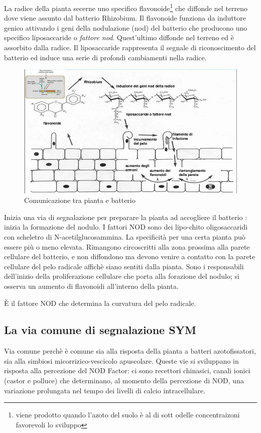 \documentclass[a4paper,12pt]{book}
\begin{document}
La radice della pianta secerne uno specifico flavonoide\footnote{viene prodotto quando l'azoto del suolo è al di sott odelle concentraizoni favorevoli lo sviluppo} che diffonde nel terreno dove viene assunto dal batterio Rhizobium. Il flavonoide funziona da induttore genico attivando i geni della nodulazione (nod) del batterio che producono uno specifico liposaccaride o \emph{fattore nod}. Quest’ultimo diffonde nel terreno ed è assorbito dalla radice. Il liposaccaride rappresenta il segnale di riconoscimento del batterio ed induce una serie di profondi cambiamenti nella radice.
\begin{figure}[H]
\centering
\includegraphics[scale=0.35]{immagini/leguminose.jpg}
\caption{Comunicazione tra pianta e batterio}
\end{figure}

Inizia una via di segnalazione per preparare la pianta ad accogliere il batterio : inizia la formazione del nodulo.
I fattori NOD sono dei lipo-chito oligosaccaridi con scheletro di N-acetilglucosammina. La specificità per una certa pianta può essere più o meno elevata. Rimangono circoscritti alla zona prossima alla parete cellulare del batterio, e non diffondono ma devono venire a contatto con la parete cellulare del pelo radicale affichè siano sentiti dalla pianta. Sono i responsabili dell'inizio della proliferazione cellulare che porta alla forazione del nodulo; si osserva un aumento di flavonoidi all'interno della pianta.

È il fattore NOD che determina la curvatura del pelo radicale.

\subsection{La via comune di segnalazione SYM}
 Via comune perchè è comune sia alla risposta della pianta a batteri azotofissatori, sia alla simbiosi micorrizico-vescicolo apuscolare.
Queste vie si sviluppano in risposta alla percezione del NOD Factor: ci sono recettori chinasici, canali ionici (castor e polluce) che determinano, al momento della percezione di NOD, una variazione prolungata nel tempo dei livelli di calcio intracellulare.
\end{document}
